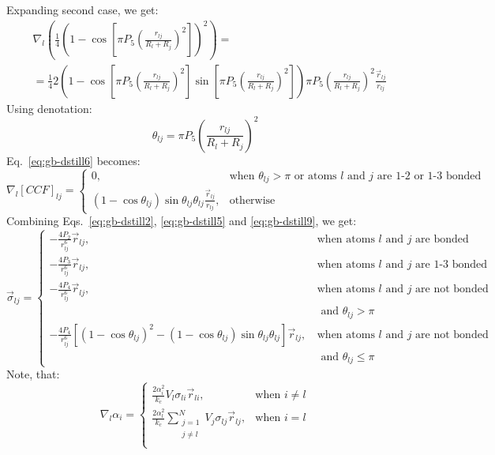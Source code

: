 \documentclass[11pt]{book}
\begin{document}
Expanding second case, we get:
\begin{equation}\label{eq:gb-dstill7}
\begin{split}
&\nabla_{l}\left(\frac{1}{4}\left(1-\cos{\left[\pi P_{5}\left(\frac{r_{lj}}{R_{l}+R_{j}}\right)^{2}\right]}\right)^{2}\right)=\\
&=\frac{1}{4}2\left(1-\cos{\left[\pi P_{5}\left(\frac{r_{lj}}{R_{l}+R_{j}}\right)^{2}\right]}\sin{\left[\pi P_{5}\left(\frac{r_{lj}}{R_{l}+R_{j}}\right)^{2}\right]}\right)\pi P_{5}\left(\frac{r_{lj}}{R_{l}+R_{j}}\right)^{2}\frac{\vec{r}_{lj}}{r_{lj}}
\end{split}
\end{equation}
Using denotation:
\begin{equation}\label{eq:gb-dstill8}
\theta_{lj}=\pi P_{5}\left(\frac{r_{lj}}{R_{l}+R_{j}}\right)^{2}
\end{equation}
Eq.~\ref{eq:gb-dstill6} becomes:
\begin{equation}\label{eq:gb-dstill9}
\nabla_{l}[CCF]_{lj}=
\begin{cases}
0, &\text{when } \theta_{lj}>\pi \text{ or atoms $l$ and $j$ are 1-2 or 1-3 bonded}\\
\left(1-\cos{\theta_{lj}}\right)\sin{\theta_{lj}}\theta_{lj}\frac{\vec{r}_{lj}}{r_{lj}}, &\text{otherwise}
\end{cases}
\end{equation}
Combining Eqs.~\ref{eq:gb-dstill2}, \ref{eq:gb-dstill5} and \ref{eq:gb-dstill9}, we get:
\begin{equation}\label{eq:gb-dstill10}
\vec{\sigma}_{lj}=
\begin{cases}
-\frac{4P_{2}}{r_{lj}^{6}}\vec{r}_{lj}\text{, }&\text{when atoms $l$ and $j$ are bonded}\\
-\frac{4P_{3}}{r_{lj}^{6}}\vec{r}_{lj}\text{, }&\text{when atoms $l$ and $j$ are 1-3 bonded}\\
-\frac{4P_{4}}{r_{lj}^{6}}\vec{r}_{lj}\text{, }&\text{when atoms $l$ and $j$ are not bonded}\\
				&\text{ and }\theta_{lj}>\pi\\
-\frac{4P_{4}}{r_{lj}^{6}}\left[\left(1-\cos{\theta_{lj}}\right)^{2}-\left(1-\cos{\theta_{lj}}\right)\sin{\theta_{lj}}\theta_{lj}\right]\vec{r}_{lj}\text{, }&\text{when atoms $l$ and $j$ are not bonded}\\
				&\text{ and }\theta_{lj}\leq\pi
\end{cases}
\end{equation}
Note, that:
\begin{equation}\label{eq:gb-dstill11}
\nabla_{l}\alpha_{i}=
\begin{cases}
\frac{2\alpha_{i}^{2}}{k_{c}}V_{l}\sigma_{li}\vec{r}_{li}, &\text{when }i\ne l\\
\frac{2\alpha_{l}^{2}}{k_{c}}\sum_{\substack{j=1\\j\ne l}}^{N}V_{j}\sigma_{lj}\vec{r}_{lj}, &\text{when }i=l\\
\end{cases}
\end{equation}
\end{document}
